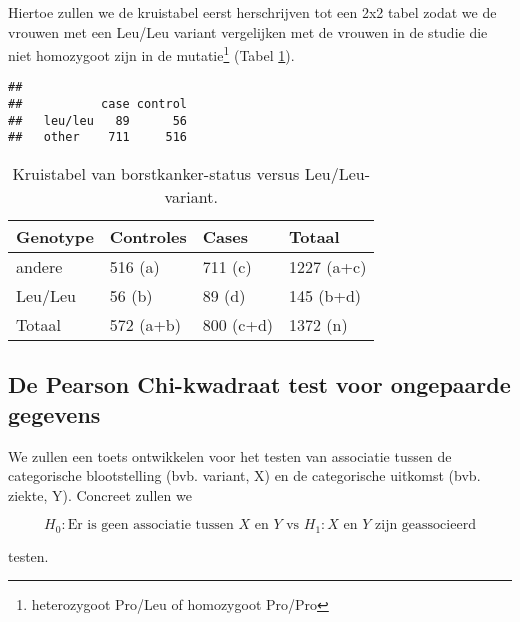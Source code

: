 \documentclass[
  12pt,dutch,coursenotes]{book}
\newenvironment{Shaded}{\begin{snugshade}}{\end{snugshade}}
\newcommand{\KeywordTok}[1]{\textcolor[rgb]{0.13,0.29,0.53}{\textbf{#1}}}
\newcommand{\NormalTok}[1]{#1}
\newcommand{\OperatorTok}[1]{\textcolor[rgb]{0.81,0.36,0.00}{\textbf{#1}}}
\newcommand{\StringTok}[1]{\textcolor[rgb]{0.31,0.60,0.02}{#1}}
\theoremstyle{definition}
\theoremstyle{definition}
\theoremstyle{definition}
\theoremstyle{remark}
\begin{document}
Hiertoe zullen we de kruistabel eerst herschrijven tot een 2x2 tabel zodat we de vrouwen met een Leu/Leu variant vergelijken met de vrouwen in de studie die niet homozygoot zijn in de mutatie\footnote{heterozygoot Pro/Leu of homozygoot Pro/Pro} (Tabel \ref{tab:leu4}).

\begin{Shaded}
\end{Shaded}

\begin{verbatim}
##          
##           case control
##   leu/leu   89      56
##   other    711     516
\end{verbatim}

\begin{table}

\caption{\label{tab:leu4}Kruistabel van borstkanker-status versus Leu/Leu-variant.}
\centering
\begin{tabular}[t]{llll}
\toprule
Genotype & Controles & Cases & Totaal\\
\midrule
andere & 516 (a) & 711 (c) & 1227 (a+c)\\
Leu/Leu & 56 (b) & 89 (d) & 145 (b+d)\\
Totaal & 572 (a+b) & 800 (c+d) & 1372 (n)\\
\bottomrule
\end{tabular}
\end{table}

\hypertarget{de-pearson-chi-kwadraat-test-voor-ongepaarde-gegevens}{%
\subsection{De Pearson Chi-kwadraat test voor ongepaarde gegevens}\label{de-pearson-chi-kwadraat-test-voor-ongepaarde-gegevens}}

We zullen een toets ontwikkelen voor het testen van associatie tussen de categorische blootstelling (bvb. variant, X) en de categorische uitkomst (bvb. ziekte, Y).
Concreet zullen we

\[H_0: \text{Er is geen associatie tussen } X \text{ en } Y \text{ vs } H_1: X \text{ en } Y \text{ zijn geassocieerd}\]

testen.
\end{document}
